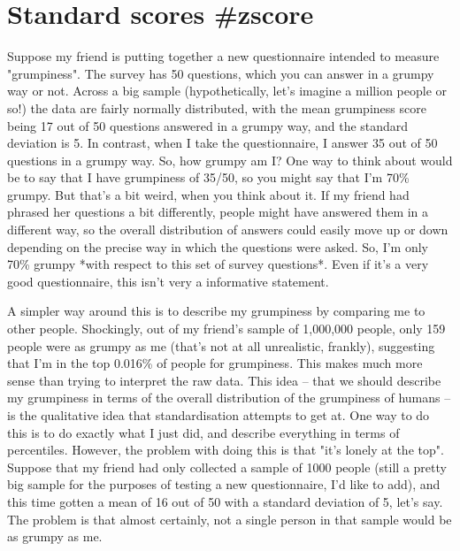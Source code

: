 \section{Standard scores {#zscore}}


Suppose my friend is putting together a new questionnaire intended to measure "grumpiness". The survey has 50 questions, which you can answer in a grumpy way or not. Across a big sample (hypothetically, let's imagine a million people or so!) the data are fairly normally distributed, with the mean grumpiness score being 17 out of 50 questions answered in a grumpy way, and the standard deviation is 5. In contrast, when I take the questionnaire, I answer 35 out of 50 questions in a grumpy way. So, how grumpy am I? One way to think about would be to say that I have grumpiness of 35/50, so you might say that I'm 70\% grumpy. But that's a bit weird, when you think about it. If my friend had phrased her questions a bit differently, people might have answered them in a different way, so the overall distribution of answers could easily move up or down depending on the precise way in which the questions were asked. So, I'm only 70\% grumpy *with respect to this set of survey questions*. Even if it's a very good questionnaire, this isn't very a informative statement. 

A simpler way around this is to describe my grumpiness by comparing me to other people. Shockingly, out of my friend's sample of 1,000,000 people, only 159 people were as grumpy as me (that's not at all unrealistic, frankly), suggesting that I'm in the top 0.016\% of people for grumpiness. This makes much more sense than trying to interpret the raw data. This idea -- that we should describe my grumpiness in terms of the overall distribution of the grumpiness of humans -- is the qualitative idea that standardisation attempts to get at. One way to do this is to do exactly what I just did, and describe everything in terms of percentiles. However, the problem with doing this is that "it's lonely at the top". Suppose that my friend had only collected a sample of 1000 people (still a pretty big sample for the purposes of testing a new questionnaire, I'd like to add), and this time gotten a mean of 16 out of 50 with a standard deviation of 5, let's say. The problem is that almost certainly, not a single person in that sample would be as grumpy as me.



